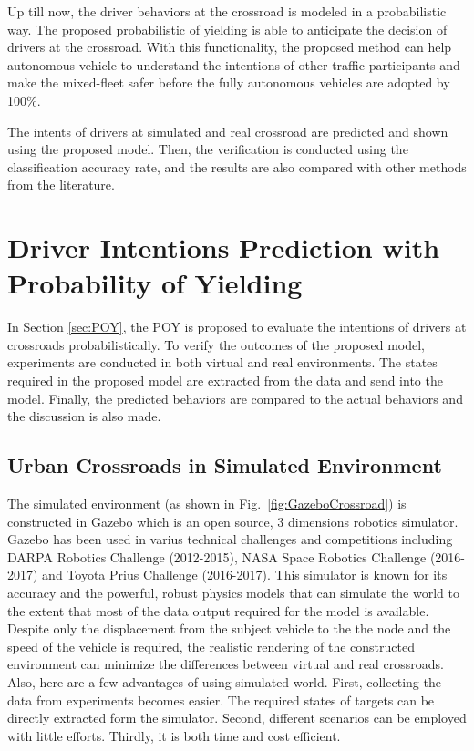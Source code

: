 Up till now, the driver behaviors at the crossroad is modeled in a probabilistic way. The proposed probabilistic of yielding is able to anticipate the decision of drivers at the crossroad. With this functionality, the proposed method can help autonomous vehicle to understand the intentions of other traffic participants and make the mixed-fleet safer before the fully autonomous vehicles are adopted by 100\%.

The intents of drivers at simulated and real crossroad are predicted and shown using the proposed model. Then, the verification is conducted using the classification accuracy rate, and the results are also compared with other methods from the literature. 


\section{Driver Intentions Prediction with Probability of Yielding}
\label{sec:ValidatePOY}

In Section \ref{sec:POY}, the \ac{POY} is proposed to evaluate the intentions of drivers at crossroads probabilistically. To verify the outcomes of the proposed model, experiments are conducted in both virtual and real environments. The states required in the proposed model are extracted from the data and send into the model. Finally, the predicted behaviors are compared to the actual behaviors and the discussion is also made.

\subsection{Urban Crossroads in Simulated Environment}
\label{sub:simulated env}

The simulated environment (as shown in Fig.~\ref{fig:GazeboCrossroad}) is constructed in Gazebo which is an open source, 3 dimensions robotics simulator. Gazebo has been used in varius technical challenges and competitions including DARPA Robotics Challenge (2012-2015), NASA Space Robotics Challenge (2016-2017) and Toyota Prius Challenge (2016-2017). This simulator is known for its accuracy and the powerful, robust physics models that can simulate the world to the extent that most of the data output required for the model is available. Despite only the displacement from the subject vehicle to the the node and the speed of the vehicle is required, the realistic rendering of the constructed environment can minimize the differences between virtual and real crossroads. Also, here are a few advantages of using simulated world. First, collecting the data from experiments becomes easier. The required states of targets can be directly extracted form the simulator. Second, different scenarios can be employed with little efforts. Thirdly, it is both time and cost efficient.

